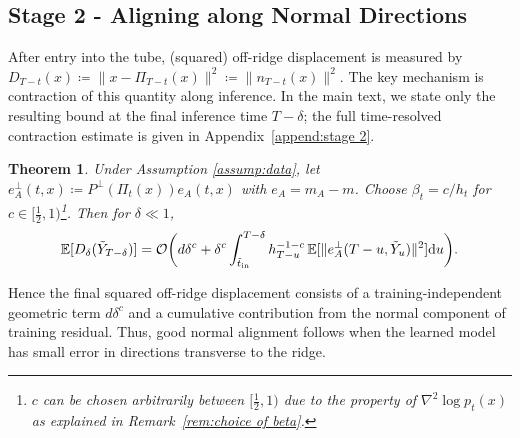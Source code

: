 \documentclass[11pt]{article}
\newcommand{\mb}{\mathbb}
\newcommand{\dee}{\mathrm{d}}
\newcommand{\mc}{\mathcal}
\newtheorem{theorem}{Theorem}[section]
\begin{document}
\subsection{Stage 2 - Aligning along Normal Directions}
\label{sec:stage2}
After entry into the tube, (squared) off-ridge displacement is measured by $D_{T-t}(x) \coloneqq \| x - \Pi_{T-t}(x) \|^2 \coloneqq \| n_{T-t}(x) \|^2$. 
The key mechanism is contraction of this quantity along inference. In the main text, we state only the resulting bound at the final inference time $T-\delta$; the full time-resolved contraction estimate is given in Appendix~\ref{append:stage 2}.

\begin{theorem}\label{them:normal contraciton} Under Assumption \ref{assump:data}, let $e_A^\perp(t,x)\coloneqq P^\perp(\Pi_t(x))e_A(t,x)$ with $e_A=m_A-m$. Choose $\beta_t=c/h_t$ for $c\in [\frac{1}{2},1)$\footnote{$c$ can be chosen arbitrarily between $[\tfrac{1}{2},1)$ due to the property of $\nabla^2\log p_t(x)$ as explained in Remark~\ref{rem:choice of beta}. }. Then for $\delta\ll 1$, 
\begin{align*}
  \mb{E}[D_{\delta}(\Tilde{Y}_{T-\delta})] = \mc{O}\bigg(d\delta^c+ \delta^c\int_{\Tilde{t}_{\mathrm{in}}}^{T-\delta}  h_{T-u}^{-1-c}\,{\mb{E}[\| e_A^\perp(T-u,\Tilde{Y}_u)\|^2]} \dee u  \bigg). \vspace{-.1cm}
\end{align*}
\end{theorem}
Hence the final squared off-ridge displacement consists of a training-independent geometric term $d\delta^c$ and a cumulative contribution from the normal component of training residual. Thus, good normal alignment follows when the learned model has small error in directions transverse to the ridge. 
\end{document}

